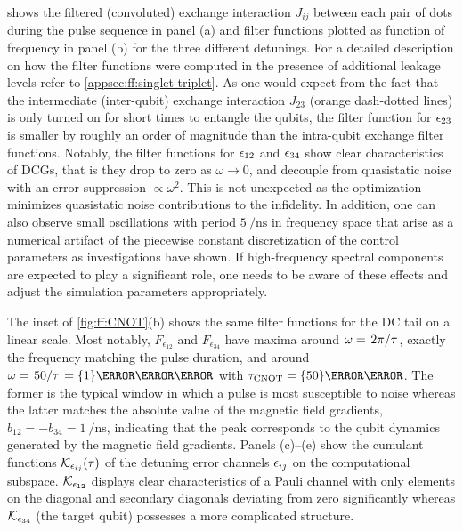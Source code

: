  shows the filtered (convoluted) exchange interaction $J_{ij}$ between each pair of dots during the pulse sequence in panel (a) and filter functions plotted as function of frequency in panel (b) for the three different detunings.
For a detailed description on how the filter functions were computed in the presence of additional leakage levels refer to \cref{appsec:ff:singlet-triplet}.
As one would expect from the fact that the intermediate (inter-qubit) exchange interaction $J_{23}$ (orange dash-dotted lines) is only turned on for short times to entangle the qubits, the filter function for $\epsilon_{23}$ is smaller by roughly an order of magnitude than the intra-qubit exchange filter functions.
Notably, the filter functions for $\epsilon_{12}$ and $\epsilon_{34}$ show clear characteristics of DCGs, that is they drop to zero as $\omega\rightarrow 0$, and decouple from quasistatic noise with an error suppression $\propto\omega^2$.
This is not unexpected as the optimization minimizes quasistatic noise contributions to the infidelity.
In addition, one can also observe small oscillations with period $\qty{5}{\per\nano\second}$ in frequency space that arise as a numerical artifact of the piecewise constant discretization of the control parameters as investigations have shown.
If high-frequency spectral components are expected to play a significant role, one needs to be aware of these effects and adjust the simulation parameters appropriately.

The inset of \cref{fig:ff:CNOT}(b) shows the same filter functions for the DC tail on a linear scale.
Most notably, $F_{\epsilon_{12}}$ and $F_{\epsilon_{34}}$ have maxima around $\omega = \flatfrac{2\pi}{\tau}$, \ie exactly the frequency matching the pulse duration, and around $\omega = \flatfrac{50}{\tau} = \qty{1}{\per\nano\second}$ with $\tau_\mr{CNOT} = \qty{50}{\nano\second}$.
The former is the typical window in which a pulse is most susceptible to noise whereas the latter matches the absolute value of the magnetic field gradients, $b_{12} = -b_{34} = \qty{1}{\per\nano\second}$, indicating that the peak corresponds to the qubit dynamics generated by the magnetic field gradients.
Panels (c)--(e) show the cumulant functions $\mathcal{K}_{\epsilon_{ij}}(\tau)$ of the detuning error channels $\epsilon_{ij}$ on the computational subspace.
$\mathcal{K}_{\epsilon_{12}}$ displays clear characteristics of a Pauli channel with only elements on the diagonal and secondary diagonals deviating from zero significantly whereas $\mathcal{K}_{\epsilon_{34}}$ (the target qubit) possesses a more complicated structure.

